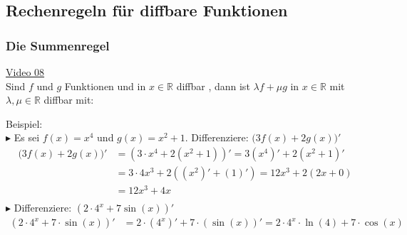 \subsection{Rechenregeln für diffbare Funktionen}
\subsubsection{Die Summenregel}
\href{https://youtu.be/hjYhkf3M6wA}{Video 08}\\
Sind $ f $ und $ g $ Funktionen und in $ x\in\mathbb{R} $ diffbar , dann ist $ \lambda f+\mu g $ in $ x\in\mathbb{R} $ mit $ \lambda,\mu \in \mathbb{R} $ diffbar mit:\\
\begin{center}
\end{center}
\newpage
\noindent
Beispiel:\\
$\blacktriangleright$ Es sei $ f(x)=x^4$ und $ g(x)=x^2+1 $. 
Differenziere: $ \big(3f(x)+2g(x)\big)' $\\
\begin{align*}
\big(3f(x)+2g(x)\big)'&=(3\cdot x^4+2(x^2+1))'=3(x^4)'+2(x^2+1)'\\
&=3\cdot 4 x^3+2((x^2)'+(1)')=12x^3+2(2x+0)\\
&=12x^3+4x\\
\end{align*}
$ \blacktriangleright $	 Differenziere: $ (2\cdot 4^x+7\sin(x))' $\\
\begin{align*}
(2\cdot 4^x+7\cdot \sin(x))'&=2\cdot(4^x)'+7\cdot(\sin(x))'=2\cdot 4^x\cdot \ln(4)+7\cdot \cos(x)\\
\end{align*}
